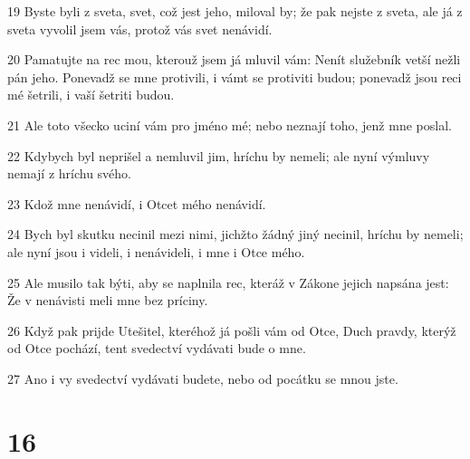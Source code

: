 \par 19 Byste byli z sveta, svet, což jest jeho, miloval by; že pak nejste z sveta, ale já z sveta vyvolil jsem vás, protož vás svet nenávidí.
\par 20 Pamatujte na rec mou, kterouž jsem já mluvil vám: Nenít služebník vetší nežli pán jeho. Ponevadž se mne protivili, i vámt se protiviti budou; ponevadž jsou reci mé šetrili, i vaší šetriti budou.
\par 21 Ale toto všecko uciní vám pro jméno mé; nebo neznají toho, jenž mne poslal.
\par 22 Kdybych byl neprišel a nemluvil jim, hríchu by nemeli; ale nyní výmluvy nemají z hríchu svého.
\par 23 Kdož mne nenávidí, i Otcet mého nenávidí.
\par 24 Bych byl skutku necinil mezi nimi, jichžto žádný jiný necinil, hríchu by nemeli; ale nyní jsou i videli, i nenávideli, i mne i Otce mého.
\par 25 Ale musilo tak býti, aby se naplnila rec, kteráž v Zákone jejich napsána jest: Že v nenávisti meli mne bez príciny.
\par 26 Když pak prijde Utešitel, kteréhož já pošli vám od Otce, Duch pravdy, kterýž od Otce pochází, tent svedectví vydávati bude o mne.
\par 27 Ano i vy svedectví vydávati budete, nebo od pocátku se mnou jste.

\chapter{16}

